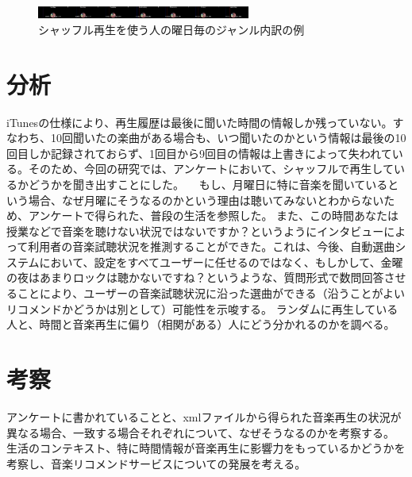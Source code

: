 \documentclass[11pt, twocolumn]{jsarticle}
\begin{document}
\begin{figure}[h]
\begin{center}
\includegraphics[width=7cm]{taru_weekGenreRatio.jpg}
\caption{シャッフル再生を使う人の曜日毎のジャンル内訳の例}
\label{weekGenreMap_shuffle}
\end{center}
\end{figure}

\section{分析}
iTunesの仕様により、再生履歴は最後に聞いた時間の情報しか残っていない。すなわち、10回聞いたの楽曲がある場合も、いつ聞いたのかという情報は最後の10回目しか記録されておらず、1回目から9回目の情報は上書きによって失われている。そのため、今回の研究では、アンケートにおいて、シャッフルで再生しているかどうかを聞き出すことにした。
　もし、月曜日に特に音楽を聞いているという場合、なぜ月曜にそうなるのかという理由は聴いてみないとわからないため、アンケートで得られた、普段の生活を参照した。
また、この時間あなたは授業などで音楽を聴けない状況ではないですか？というようにインタビューによって利用者の音楽試聴状況を推測することができた。これは、今後、自動選曲システムにおいて、設定をすべてユーザーに任せるのではなく、もしかして、金曜の夜はあまりロックは聴かないですね？というような、質問形式で数問回答させることにより、ユーザーの音楽試聴状況に沿った選曲ができる（沿うことがよいリコメンドかどうかは別として）可能性を示唆する。
ランダムに再生している人と、時間と音楽再生に偏り（相関がある）人にどう分かれるのかを調べる。

\section{考察}
アンケートに書かれていることと、xmlファイルから得られた音楽再生の状況が異なる場合、一致する場合それぞれについて、なぜそうなるのかを考察する。
生活のコンテキスト、特に時間情報が音楽再生に影響力をもっているかどうかを考察し、音楽リコメンドサービスについての発展を考える。
\end{document}
